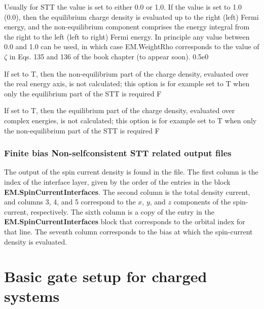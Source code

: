 \documentclass[11pt]{article}
\begin{document}
{Usually for STT the value is set to either 0.0 or 1.0. If the value is set to 1.0 (0.0), then the equilibrium charge density is evaluated up to the right (left) Fermi energy, and the non-equilibrium component comprises the energy integral from the right to the left (left to right) Fermi energy. In principle any value between 0.0 and 1.0 can be used, in which case EM.WeightRho corresponds to the value of $\zeta$ in Eqs. 135 and 136 of the book chapter (to appear soon).}
{0.5e0}

{If set to T, then the non-equilibrium part of the charge density, evaluated over the real energy axis, is not calculated; this option is for example set to T when only the equilibrium part of the STT is required}
{F}

{If set to T, then the equilibrium part of the charge density, evaluated over complex energies, is not calculated; this option is for example set to T when only the non-equilibrium part of the STT is required}
{F}

\subsubsection{Finite bias Non-selfconsistent STT related output files}

\vspace{0.5cm}
{The output of the spin current density is found in the  file. The first column is the index of the interface layer, given by the order of the entries in the block {\bf EM.SpinCurrentInterfaces}. The second column is the total density current, and columns 3, 4, and 5 correspond to the $x$, $y$, and $z$ components of the spin-current, respectively. The sixth column is a copy of the entry in the {\bf EM.SpinCurrentInterfaces} block that corresponds to the orbital index for that line. The seventh column corresponds to the bias at which the spin-current density is evaluated.}


\newpage
\section {Basic gate setup for charged systems}
\label{sec:gating}
\end{document}
